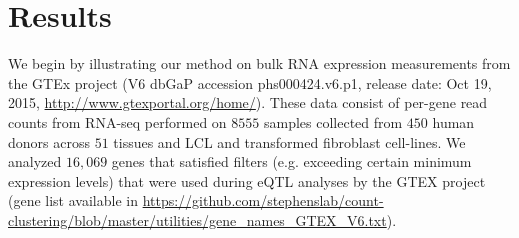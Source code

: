 \section{Results}

%
%
%
%
%
%
%
%
%
%
%

We begin by illustrating our method on bulk RNA expression measurements from the GTEx project (V6 dbGaP accession phs000424.v6.p1, release date: Oct 19, 2015, \url{http://www.gtexportal.org/home/}).  These data consist of per-gene read counts from RNA-seq performed on $8555$ samples collected from $450$ human donors across $51$ tissues and LCL and transformed fibroblast cell-lines. We analyzed $16,069$ genes that satisfied filters (e.g. exceeding certain minimum expression levels) that were used during eQTL analyses by the GTEX project (gene list available in \url{https://github.com/stephenslab/count-clustering/blob/master/utilities/gene_names_GTEX_V6.txt}). 

